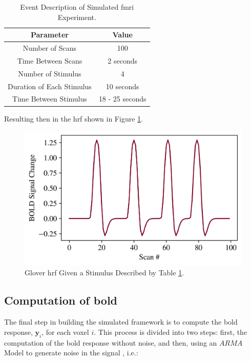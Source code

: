 \begin{table}[htbp!]
\centering
\caption{Event Description of Simulated \gls{fmri} Experiment.}
\begin{tabular}{cc}
\hline
\textbf{Parameter} & \textbf{Value} \\ \hline
Number of Scans & 100 \\
Time Between Scans & 2 seconds \\
Number of Stimulus & 4 \\
Duration of Each Stimulus & 10 seconds \\
Time Between Stimulus & 18 - 25 seconds \\ \hline
\end{tabular}
\label{tab:eventsSim}
\end{table}

Resulting then in the \gls{hrf} shown in Figure \ref{fig:gloverHRF}.

\begin{figure}[htbp!]
\centering
\includegraphics{images/gloverHRF.png}
\caption{Glover \gls{hrf} Given a Stimulus Described by Table \ref{tab:eventsSim}.}
\label{fig:gloverHRF}
\end{figure}

\subsection{Computation of \gls{bold}}

The final step in building the simulated framework is to compute the \gls{bold} response, $\bm{y}_i$, for each voxel $i$. This process is divided into two steps: first, the computation of the \gls{bold} response without noise, and then, using an $ARMA$ Model to generate noise in the signal \cite{choi2012arma}, i.e.:


